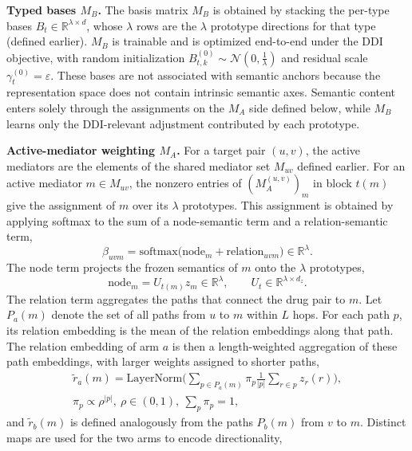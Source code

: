 \documentclass[letterpaper]{article} %
\begin{document}
\textbf{Typed bases $M_B$.} The basis matrix $M_B$ is obtained by stacking the per-type bases $B_t\in\mathbb{R}^{\lambda\times d}$, whose $\lambda$ rows are the $\lambda$ prototype directions for that type (defined earlier). $M_B$ is trainable and is optimized end-to-end under the DDI objective, with random initialization $B_{t,k}^{(0)}\sim\mathcal{N}(0,\tfrac{1}{\lambda})$ and residual scale $\gamma_t^{(0)}=\varepsilon$. These bases are not associated with semantic anchors because the representation space does not contain intrinsic semantic axes. Semantic content enters solely through the assignments on the $M_A$ side defined below, while $M_B$ learns only the DDI-relevant adjustment contributed by each prototype.

\textbf{Active-mediator weighting $M_A$.} For a target pair $(u,v)$, the active mediators are the elements of the shared mediator set $M_{uv}$ defined earlier. For an active mediator $m\in M_{uv}$, the nonzero entries of $(M_A^{(u,v)})_m$ in block $t(m)$ give the assignment of $m$ over its $\lambda$ prototypes. This assignment is obtained by applying softmax to the sum of a node-semantic term and a relation-semantic term,
\begin{equation}
\beta_{uvm} = \mathrm{softmax}\big(\mathrm{node}_m + \mathrm{relation}_{uvm}\big)\in\mathbb{R}^{\lambda}.
\end{equation}
The node term projects the frozen semantics of $m$ onto the $\lambda$ prototypes,
\begin{equation}
\mathrm{node}_m = U_{t(m)}z_m\in\mathbb{R}^{\lambda},\qquad U_t\in\mathbb{R}^{\lambda\times d_z}.
\end{equation}
The relation term aggregates the paths that connect the drug pair to $m$. Let $P_a(m)$ denote the set of all paths from $u$ to $m$ within $L$ hops. For each path $p$, its relation embedding is the mean of the relation embeddings along that path. The relation embedding of arm $a$ is then a length-weighted aggregation of these path embeddings, with larger weights assigned to shorter paths,
\begin{equation}
\begin{array}{c}
\tilde{r}_a(m) = \mathrm{LayerNorm}\Big(\sum_{p\in P_a(m)} \pi_p\frac{1}{|p|}\sum_{r\in p} z_r(r)\Big),\\
\pi_p\propto\rho^{|p|},\ \rho\in(0,1),\ \sum_p\pi_p=1, 
\end{array}
\end{equation}
and $\tilde{r}_b(m)$ is defined analogously from the paths $P_b(m)$ from $v$ to $m$. Distinct maps are used for the two arms to encode directionality,
\end{document}
